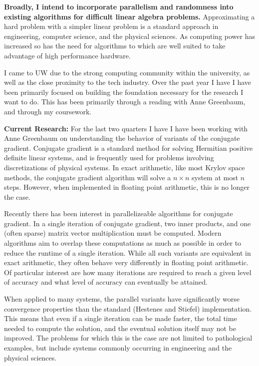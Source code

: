 \documentclass[11pt]{article}
\begin{document}
\maketitle
\vspace{2em}

\textbf{Broadly, I intend to incorporate parallelism and randomness into existing algorithms for difficult linear algebra problems.}
Approximating a hard problem with a simpler linear problem is a standard approach in engineering, computer science, and the physical sciences. As computing power has increased so has the need for algorithms to which are well suited to take advantage of high performance hardware.

I came to UW due to the strong computing community within the university, as well as the close proximity to the tech industry. Over the past year I have I have been primarily focused on building the foundation necessary for the research I want to do. This has been primarily through a reading with Anne Greenbaum, and through my coursework.

\textbf{Current Research:}
For the last two quarters I have I have been working with Anne Greenbaum on understanding the behavior of variants of the conjugate gradient. 
Conjugate gradient is a standard method for solving Hermitian positive definite linear systems, and is frequently used for problems involving discretizations of physical systems. In exact arithmetic, like most Krylov space methods, the conjugate gradient algorithm will solve a \( n\times n \) system at most \( n \) steps. However, when implemented in floating point arithmetic, this is no longer the case.

Recently there has been interest in parallelizeable algorithms for conjugate gradient. In a single iteration of conjugate gradient, two inner products, and one (often sparse) matrix vector multiplication must be computed. Modern algorithms aim to overlap these computations as much as possible in order to reduce the runtime of a single iteration.
While all such variants are equivalent in exact arithmetic, they often behave very differently in floating point arithmetic. Of particular interest are how many iterations are required to reach a given level of accuracy and what level of accuracy can eventually be attained.

When applied to many systems, the parallel variants have significantly worse convergence properties than the standard (Hestenes and Stiefel) implementation. 
This means that even if a single iteration can be made faster, the total time needed to compute the solution, and the eventual solution itself may not be improved. The problems for which this is the case are not limited to pathological examples, but include systems commonly occurring in engineering and the physical sciences.
\end{document}
